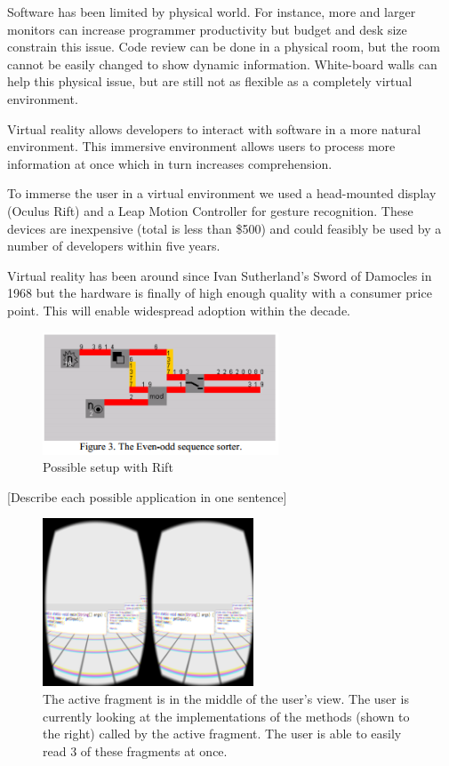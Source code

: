 \documentclass{acm_proc_article-sp}
\begin{document}
Software has been limited by physical world. For instance, more and larger monitors can increase programmer productivity but budget and desk size constrain this issue.
Code review can be done in a physical room, but the room cannot be easily changed to show dynamic information. White-board walls can help this physical issue, but are still not as flexible as a completely virtual environment.

Virtual reality allows developers to interact with software in a more natural environment. This immersive environment allows users to process more information at once which in turn increases comprehension.

To immerse the user in a virtual environment we used a head-mounted display (Oculus Rift) and a Leap Motion Controller for gesture recognition. These devices are inexpensive (total is less than \$500) and could feasibly be used by a number of developers within five years.

Virtual reality has been around since Ivan Sutherland's Sword of Damocles in 1968 but the hardware is finally of high enough quality with a consumer price point. This will enable widespread adoption within the decade.

\begin{figure}[ht!]
\centering
\includegraphics[width=70mm]{EvenOdd}
\caption{Possible setup with Rift \label{overflow}}
\end{figure}

[Describe each possible application in one sentence]

\begin{figure}[ht]
\centering
\includegraphics[width=\textwidth,height=5cm]{stack}
\caption{The active fragment is in the middle of the user's view. The user is currently looking at the implementations of the methods (shown to the right) called by the active fragment. The user is able to easily read 3 of these fragments at once.  \label{immersion}}
\end{figure}
\end{document}
